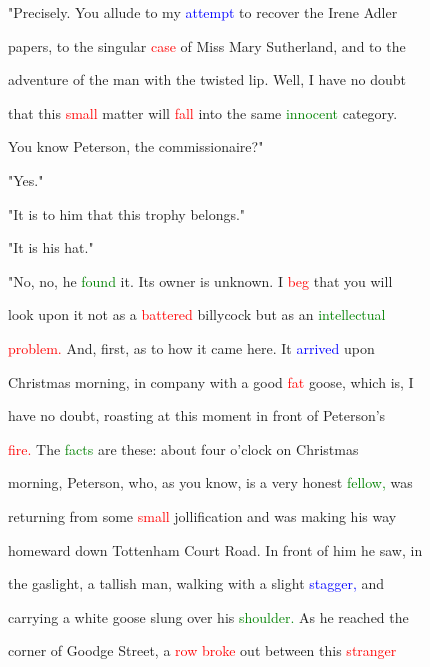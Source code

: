  "Precisely. You allude to my \textcolor{blue}{attempt} to recover the Irene Adler

 papers, to the singular \textcolor{red}{case} of Miss Mary Sutherland, and to the

 \textcolor{BurntOrange}{adventure} of the man with the twisted lip. Well, I have no \textcolor{BurntOrange}{doubt}

 that this \textcolor{red}{small} matter will \textcolor{red}{fall} into the same \textcolor{green}{innocent} category.

 You know Peterson, the commissionaire?"



 "Yes."



 "It is to him that this \textcolor{BurntOrange}{trophy} belongs."



 "It is his hat."



 "No, no, he \textcolor{green}{found} it. Its owner is \textcolor{BurntOrange}{unknown.} I \textcolor{red}{beg} that you will

 look upon it not as a \textcolor{red}{battered} billycock but as an \textcolor{green}{intellectual}

 \textcolor{red}{problem.} And, first, as to how it came here. It \textcolor{blue}{arrived} upon

 Christmas morning, in company with a \textcolor{BurntOrange}{good} \textcolor{red}{fat} goose, which is, I

 have no \textcolor{BurntOrange}{doubt,} roasting at this moment in front of Peterson's

 \textcolor{red}{fire.} The \textcolor{green}{facts} are these: about four o'clock on Christmas

 morning, Peterson, who, as you know, is a very \textcolor{BurntOrange}{honest} \textcolor{green}{fellow,} was

 returning from some \textcolor{red}{small} jollification and was making his way

 homeward down Tottenham \textcolor{BurntOrange}{Court} Road. In front of him he saw, in

 the gaslight, a tallish man, walking with a slight \textcolor{blue}{stagger,} and

 carrying a \textcolor{BurntOrange}{white} goose slung over his \textcolor{green}{shoulder.} As he reached the

 corner of Goodge Street, a \textcolor{red}{row} \textcolor{red}{broke} out between this \textcolor{red}{stranger}

